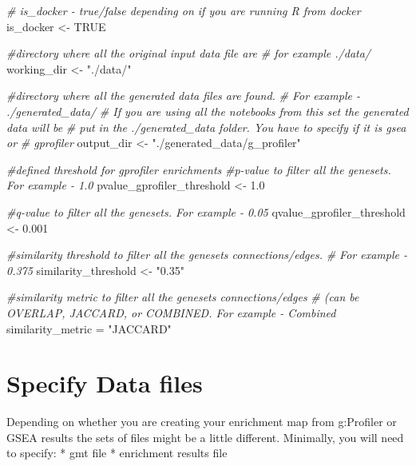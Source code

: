 \documentclass[
]{book}
\newenvironment{Shaded}{\begin{snugshade}}{\end{snugshade}}
\newcommand{\CommentTok}[1]{\textcolor[rgb]{0.56,0.35,0.01}{\textit{#1}}}
\newcommand{\ConstantTok}[1]{\textcolor[rgb]{0.56,0.35,0.01}{#1}}
\newcommand{\FloatTok}[1]{\textcolor[rgb]{0.00,0.00,0.81}{#1}}
\newcommand{\NormalTok}[1]{#1}
\newcommand{\OtherTok}[1]{\textcolor[rgb]{0.56,0.35,0.01}{#1}}
\newcommand{\StringTok}[1]{\textcolor[rgb]{0.31,0.60,0.02}{#1}}
\begin{document}
\begin{Shaded}
\begin{Highlighting}[]
\CommentTok{\# is\_docker {-} true/false depending on if you are running R from docker}
\NormalTok{is\_docker }\OtherTok{\textless{}{-}} \ConstantTok{TRUE}

\CommentTok{\#directory where all the original input data file are}
\CommentTok{\# for example ./data/}
\NormalTok{working\_dir }\OtherTok{\textless{}{-}} \StringTok{"./data/"}


\CommentTok{\#directory where all the generated data files are found.}
\CommentTok{\# For example {-} ./generated\_data/}
\CommentTok{\# If you are using all the notebooks from this set the generated data will be}
\CommentTok{\# put in the ./generated\_data folder.  You have to specify if it is gsea or }
\CommentTok{\# gprofiler}
\NormalTok{output\_dir }\OtherTok{\textless{}{-}} \StringTok{"./generated\_data/g\_profiler"}


\CommentTok{\#defined threshold for gprofiler enrichments }
\CommentTok{\#p{-}value to filter all the genesets.  For example {-}   1.0}
\NormalTok{pvalue\_gprofiler\_threshold }\OtherTok{\textless{}{-}} \FloatTok{1.0}

\CommentTok{\#q{-}value to filter all the genesets.  For example {-}   0.05}
\NormalTok{qvalue\_gprofiler\_threshold }\OtherTok{\textless{}{-}} \FloatTok{0.001}

\CommentTok{\#similarity threshold to filter all the genesets connections/edges.  }
\CommentTok{\# For example {-}   0.375}
\NormalTok{similarity\_threshold }\OtherTok{\textless{}{-}} \StringTok{"0.35"}

\CommentTok{\#similarity metric to filter all the genesets connections/edges }
\CommentTok{\# (can be OVERLAP, JACCARD, or COMBINED.   For example {-}   Combined}
\NormalTok{similarity\_metric }\OtherTok{=} \StringTok{"JACCARD"}
\end{Highlighting}
\end{Shaded}

\hypertarget{specify-data-files}{%
\section{Specify Data files}\label{specify-data-files}}

Depending on whether you are creating your enrichment map from g:Profiler or GSEA results the sets of files might be a little different. Minimally, you will need to specify:
* gmt file
* enrichment results file
\end{document}
